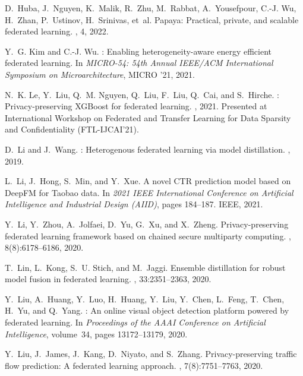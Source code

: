 \documentclass{article}
\begin{document}
\begin{thebibliography}{10}
D.~Huba, J.~Nguyen, K.~Malik, R.~Zhu, M.~Rabbat, A.~Yousefpour, C.-J. Wu,
  H.~Zhan, P.~Ustinov, H.~Srinivas, et~al.
\newblock Papaya: Practical, private, and scalable federated learning.
, 4, 2022.

Y.~G. Kim and C.-J. Wu.
: Enabling heterogeneity-aware energy efficient federated
  learning.
\newblock In {\em MICRO-54: 54th Annual IEEE/ACM International Symposium on
  Microarchitecture}, MICRO '21, 2021.

N.~K. Le, Y.~Liu, Q.~M. Nguyen, Q.~Liu, F.~Liu, Q.~Cai, and S.~Hirche.
: Privacy-preserving {XGBoost} for federated learning.
, 2021.
\newblock Presented at International Workshop on Federated and Transfer
  Learning for Data Sparsity and Confidentiality (FTL-IJCAI'21).

D.~Li and J.~Wang.
: Heterogenous federated learning via model distillation.
, 2019.

L.~Li, J.~Hong, S.~Min, and Y.~Xue.
\newblock A novel {CTR} prediction model based on {DeepFM} for {T}aobao data.
\newblock In {\em 2021 IEEE International Conference on Artificial Intelligence
  and Industrial Design (AIID)}, pages 184--187. IEEE, 2021.

Y.~Li, Y.~Zhou, A.~Jolfaei, D.~Yu, G.~Xu, and X.~Zheng.
\newblock Privacy-preserving federated learning framework based on chained
  secure multiparty computing.
, 8(8):6178--6186, 2020.

T.~Lin, L.~Kong, S.~U. Stich, and M.~Jaggi.
\newblock Ensemble distillation for robust model fusion in federated learning.
,
  33:2351--2363, 2020.

Y.~Liu, A.~Huang, Y.~Luo, H.~Huang, Y.~Liu, Y.~Chen, L.~Feng, T.~Chen, H.~Yu,
  and Q.~Yang.
: An online visual object detection platform powered by
  federated learning.
\newblock In {\em Proceedings of the AAAI Conference on Artificial
  Intelligence}, volume~34, pages 13172--13179, 2020.

Y.~Liu, J.~James, J.~Kang, D.~Niyato, and S.~Zhang.
\newblock Privacy-preserving traffic flow prediction: A federated learning
  approach.
, 7(8):7751--7763, 2020.


\end{thebibliography}
\end{document}
